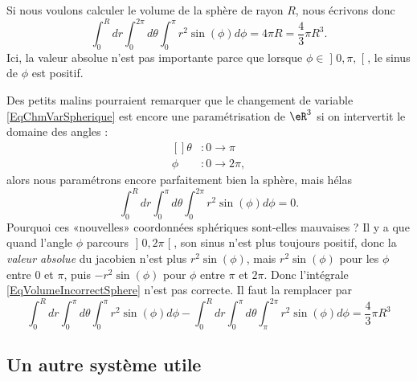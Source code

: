\begin{example}
    Si nous voulons calculer le volume de la sphère de rayon $R$, nous écrivons donc
    \begin{equation}
        \int_0^Rdr\int_{0}^{2\pi}d\theta\int_0^{\pi}r^2 \sin(\phi)d\phi=4\pi R=\frac{ 4 }{ 3 }\pi R^3.
    \end{equation}
    Ici, la valeur absolue n'est pas importante parce que lorsque $\phi\in\mathopen] 0,\pi ,  \mathclose[$, le sinus de $\phi$ est positif.

    Des petits malins pourraient remarquer que le changement de variable \eqref{EqChmVarSpherique} est encore une paramétrisation de $\eR^3$ si on intervertit le domaine des angles :
    \begin{equation}
        \begin{aligned}[]
            \theta&\colon 0 \to \pi\\
            \phi	&\colon 0\to 2\pi,
        \end{aligned}
    \end{equation}
    alors nous paramétrons encore parfaitement bien la sphère, mais hélas
    \begin{equation}		\label{EqVolumeIncorrectSphere}
        \int_0^Rdr\int_{0}^{\pi}d\theta\int_0^{2\pi}r^2 \sin(\phi)d\phi=0.
    \end{equation}
    Pourquoi ces «nouvelles» coordonnées sphériques sont-elles mauvaises ? Il y a que quand l'angle $\phi$ parcours $\mathopen] 0 , 2\pi \mathclose[$, son sinus n'est plus toujours positif, donc la \emph{valeur absolue} du jacobien n'est plus $r^2\sin(\phi)$, mais $r^2\sin(\phi)$ pour les $\phi$ entre $0$ et $\pi$, puis $-r^2\sin(\phi)$ pour $\phi$ entre $\pi$ et $2\pi$. Donc l'intégrale \eqref{EqVolumeIncorrectSphere} n'est pas correcte. Il faut la remplacer par
    \begin{equation}
        \int_0^Rdr\int_{0}^{\pi}d\theta\int_0^{\pi}r^2 \sin(\phi)d\phi- \int_0^Rdr\int_{0}^{\pi}d\theta\int_{\pi}^{2\pi}r^2 \sin(\phi)d\phi = \frac{ 4 }{ 3 }\pi R^3
    \end{equation}

\end{example}

\subsection{Un autre système utile}

